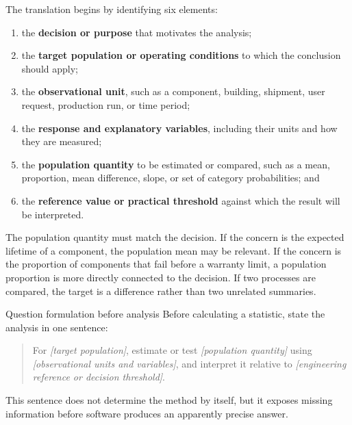 The translation begins by identifying six elements:
\begin{enumerate}
  \item the \textbf{decision or purpose} that motivates the analysis;
  \item the \textbf{target population or operating conditions} to which the conclusion should apply;
  \item the \textbf{observational unit}, such as a component, building, shipment, user request, production run, or time period;
  \item the \textbf{response and explanatory variables}, including their units and how they are measured;
  \item the \textbf{population quantity} to be estimated or compared, such as a mean, proportion, mean difference, slope, or set of category probabilities; and
  \item the \textbf{reference value or practical threshold} against which the result will be interpreted.
\end{enumerate}

The population quantity must match the decision. If the concern is the expected lifetime of a component, the population mean may be relevant. If the concern is the proportion of components that fail before a warranty limit, a population proportion is more directly connected to the decision. If two processes are compared, the target is a difference rather than two unrelated summaries.

\begin{custombox}{Question formulation before analysis}
Before calculating a statistic, state the analysis in one sentence:
\begin{quote}
For \emph{[target population]}, estimate or test \emph{[population quantity]} using \emph{[observational units and variables]}, and interpret it relative to \emph{[engineering reference or decision threshold]}.
\end{quote}
This sentence does not determine the method by itself, but it exposes missing information before software produces an apparently precise answer.
\end{custombox}

